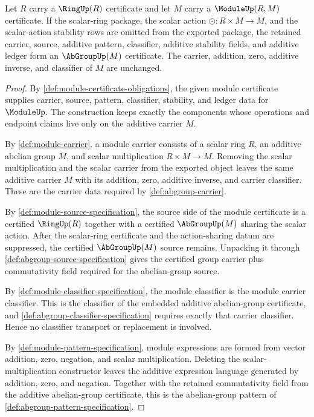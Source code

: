 \begin{proposition}
\label{prop:module-forgets-abgroup-certificate}
Let $R$ carry a $\RingUp(R)$ certificate and let $M$ carry a $\ModuleUp(R,M)$ certificate. If the scalar-ring package, the scalar action $\odot:R\times M\to M$, and the scalar-action stability rows are omitted from the exported package, the retained carrier, source, additive pattern, classifier, additive stability fields, and additive ledger form an $\AbGroupUp(M)$ certificate. The carrier, addition, zero, additive inverse, and classifier of $M$ are unchanged.
\end{proposition}
\begin{proof}
By \autoref{def:module-certificate-obligations}, the given module certificate supplies carrier, source, pattern, classifier, stability, and ledger data for $\ModuleUp$. The construction keeps exactly the components whose operations and endpoint claims live only on the additive carrier $M$.

By \autoref{def:module-carrier}, a module carrier consists of a scalar ring $R$, an additive abelian group $M$, and scalar multiplication $R\times M\to M$. Removing the scalar multiplication and the scalar carrier from the exported object leaves the same additive carrier $M$ with its addition, zero, additive inverse, and carrier classifier. These are the carrier data required by \autoref{def:abgroup-carrier}.

By \autoref{def:module-source-specification}, the source side of the module certificate is a certified $\RingUp(R)$ together with a certified $\AbGroupUp(M)$ sharing the scalar action. After the scalar-ring certificate and the action-sharing datum are suppressed, the certified $\AbGroupUp(M)$ source remains. Unpacking it through \autoref{def:abgroup-source-specification} gives the certified group carrier plus commutativity field required for the abelian-group source.

By \autoref{def:module-classifier-specification}, the module classifier is the module carrier classifier. This is the classifier of the embedded additive abelian-group certificate, and \autoref{def:abgroup-classifier-specification} requires exactly that carrier classifier. Hence no classifier transport or replacement is involved.

By \autoref{def:module-pattern-specification}, module expressions are formed from vector addition, zero, negation, and scalar multiplication. Deleting the scalar-multiplication constructor leaves the additive expression language generated by addition, zero, and negation. Together with the retained commutativity field from the additive abelian-group certificate, this is the abelian-group pattern of \autoref{def:abgroup-pattern-specification}.


\end{proof}
